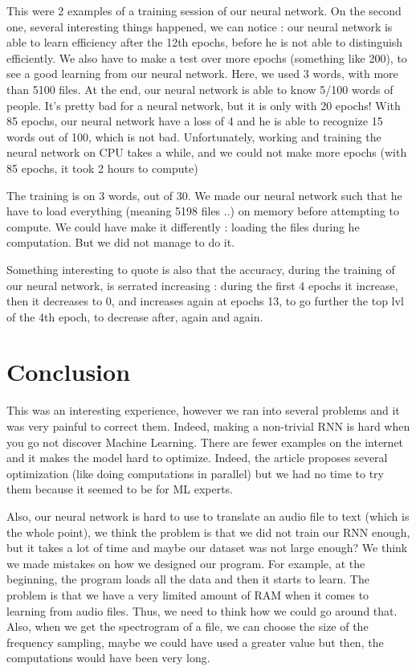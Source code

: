 \documentclass[12pt]{article}
\begin{document}
This were 2 examples of a training session of our neural network. On the second one, several interesting things happened, we can notice : our neural network is able to learn efficiency after the 12th epochs, before he is not able to distinguish efficiently. We also have to make a test over more epochs (something like 200), to see a good learning from our neural network. 
Here, we used 3 words, with more than 5100 files. At the end, our neural network is able to know 5/100 words of people. It's pretty bad for a neural network, but it is only with 20 epochs! 
With 85 epochs, our neural network have a loss of 4 and he is able to recognize 15 words out of 100, which is not bad. Unfortunately, working and training the neural network on CPU takes a while, and we could not make more epochs (with 85 epochs, it took 2 hours to compute)

The training is on 3 words, out of 30. We made our neural network such that he have to load everything (meaning 5198 files ..) on memory before attempting to compute. We could have make it differently : loading the files during he computation. But we did not manage to do it.

Something interesting to quote is also that the accuracy, during the training of our neural network, is serrated increasing : during the first 4 epochs it increase, then it decreases to 0, and increases again at epochs 13, to go further the top lvl of the 4th epoch, to decrease after, again and again. 


\newpage
\section{Conclusion}

This was an interesting experience, however we ran into several problems and it was very painful to correct them. Indeed, making a non-trivial RNN is hard when you go not discover Machine Learning. There are fewer examples on the internet and it makes the model hard to optimize. Indeed, the article proposes several optimization (like doing computations in parallel) but we had no time to try them because it seemed to be for ML experts.

Also, our neural network is hard to use to translate an audio file to text (which is the whole point), we think the problem is that we did not train our RNN enough, but it takes a lot of time and maybe our dataset was not large enough? We think we made mistakes on how we designed our program. For example, at the beginning, the program loads all the data and then it starts to learn. The problem is that we have a very limited amount of RAM when it comes to learning from audio files. Thus, we need to think how we could go around that. Also, when we get the spectrogram of a file, we can choose the size of the frequency sampling, maybe we could have used a greater value but then, the computations would have been very long.
\end{document}
